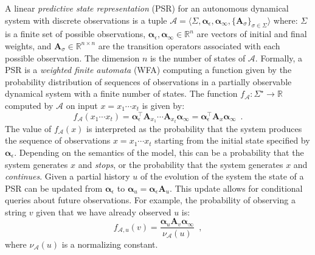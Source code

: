 \documentclass[letterpaper]{article}
\newcommand{\mat}[1]{\mathbf{#1}}
\newcommand{\A}{\mat{A}}
\newcommand{\Rset}{\mathbb{R}}
\newcommand{\alphavec}{\boldsymbol{\alpha}}
\newcommand{\aone}{\boldsymbol{\alpha}_\epsilon}
\newcommand{\ainf}{\boldsymbol{\alpha}_{\infty}}
\newcommand{\psrA}{\mathcal{A}}
\newcommand{\psrsigma}{\langle \Sigma, \aone, \ainf, \{\A_\sigma\}_{\sigma \in \Sigma} \rangle}
\begin{document}
A linear \emph{predictive state representation} (PSR) for an autonomous dynamical system with discrete observations is a tuple $\psrA = \psrsigma$ where: $\Sigma$ is a finite set of possible observations, $\aone, \ainf \in \Rset^n$ are vectors of initial and final weights, and $\A_\sigma \in \Rset^{n \times n}$ are the transition operators associated with each possible observation. The dimension $n$ is the number of states of $\psrA$. Formally, a PSR is a \emph{weighted finite automata} (WFA) \cite{wfahandbook} computing a function given by the probability distribution of sequences of observations in a partially observable dynamical system with a finite number of states. The function $f_{\psrA} : \Sigma^\star \to \Rset$ computed by $\psrA$ on input $x = x_1 \cdots x_t$ is given by:
\begin{equation*}
f_{\psrA}(x_1 \cdots x_t) = \aone^\top \A_{x_1} \cdots \A_{x_t} \ainf = \aone^\top \A_x \ainf \enspace.
\end{equation*}
%
%
The value of $f_{\psrA}(x)$ is interpreted as the probability that the system produces the sequence of observations $x = x_1 \cdots x_t$ starting from the initial state specified by $\aone$. Depending on the semantics of the model, this can be a probability that the system generates $x$ and \emph{stops}, or the probability that the system generates $x$ and \emph{continues}.
%
Given a partial history $u$ of the evolution of the system the state of a PSR can be updated from $\aone$ to $\alphavec_u = \aone \A_u$. This update allows for conditional queries about future observations. For example, the probability of observing a string $v$ given that we have already observed $u$ is:
\begin{equation*}
f_{\psrA,u}(v) = \frac{\alphavec_u \A_v \ainf}{\nu_{\psrA}(u)} \enspace,
\end{equation*}
where $\nu_{\psrA}(u)$ is a normalizing constant.
\end{document}
